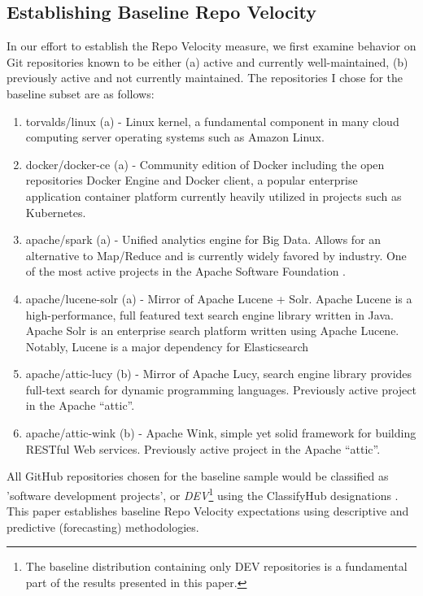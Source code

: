 \documentclass{article}
\begin{document}
\subsection{Establishing Baseline Repo Velocity}

In our effort to establish the Repo Velocity measure, we first examine
behavior on Git repositories known to be either (a) active and currently
well-maintained, (b) previously active and not currently maintained. The
repositories I chose for the baseline subset are as follows:

\begin{enumerate}
\item torvalds/linux (a) - Linux kernel, a fundamental component in many
  cloud computing server operating systems such as Amazon Linux.
\item docker/docker-ce (a) - Community edition of Docker including the open
  repositories Docker Engine and Docker client, a popular enterprise
  application container platform currently heavily utilized in projects
  such as Kubernetes.
\item apache/spark (a) - Unified analytics engine for Big Data. Allows for
  an alternative to Map/Reduce and is currently widely favored by industry.
  One of the most active projects in the Apache Software Foundation
  \cite{TheApach51:online}.
\item apache/lucene-solr (a) - Mirror of Apache Lucene + Solr. Apache Lucene
  is a high-performance, full featured text search engine library written in
  Java. Apache Solr is an enterprise search platform written using Apache
  Lucene. Notably, Lucene is a major dependency for Elasticsearch
  \cite{elastics3:online}
\item apache/attic-lucy (b) - Mirror of Apache Lucy, search engine library
  provides full-text search for dynamic programming languages. Previously
  active project in the Apache ``attic''.
\item apache/attic-wink (b) - Apache Wink, simple yet solid framework for
  building RESTful Web services. Previously active project in the Apache
  ``attic''.
\end{enumerate}

All GitHub repositories chosen for the baseline sample would be classified
as 'software development projects', or \textit{DEV}\footnote{The baseline
  distribution containing only DEV repositories is a fundamental part of
  the results presented in this paper.} using the ClassifyHub designations
\cite{soll2017classifyhub}. This paper establishes baseline Repo Velocity
expectations using descriptive and predictive (forecasting) methodologies.
\end{document}
